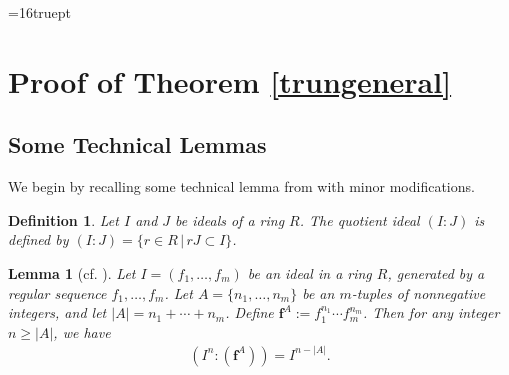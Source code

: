 \documentclass[10pt]{amsart}
\numberwithin{equation}{section}
\theoremstyle{plain}
\newtheorem{lemma}[theorem]{Lemma}
\newtheorem{definition}[theorem]{Definition}
\theoremstyle{definition}
\begin{document}
 
 
\baselineskip=16truept \maketitle \pagestyle{myheadings}
\section{Proof of Theorem \ref{trungeneral}}\label{ProofMain}
\subsection{Some Technical Lemmas}
 
 We begin by recalling some technical lemma from \cite{HLX} with minor modifications. 
\begin{definition}
Let $I$ and $J$ be ideals of a ring $R$.  The quotient ideal $(I:J)$ is defined by $(I:J)=\{r\in R\,|\, rJ\subset I\}$.
\end{definition}
\begin{lemma}[cf. {\cite[Lemma 2.9]{HLX}}]\label{ideallemma}
    Let $I=(f_1,\ldots, f_m)$ be an ideal in a ring $R$, generated by a regular sequence $f_1,\ldots, f_m$. 
Let  $A=\{n_1,\ldots, n_m\} $ be an $m$-tuples of nonnegative integers, and let $|A|=n_1+\cdots+n_m$.  Define $\mathbf{f}^A:=f_1^{n_1}\cdots f_m^{n_m}$.  Then for any integer $n\ge |A|$, we have
\begin{align*}
(I^n:(\mathbf{f}^A))=I^{n-|A|}.
\end{align*}

\end{lemma}
\end{document}
